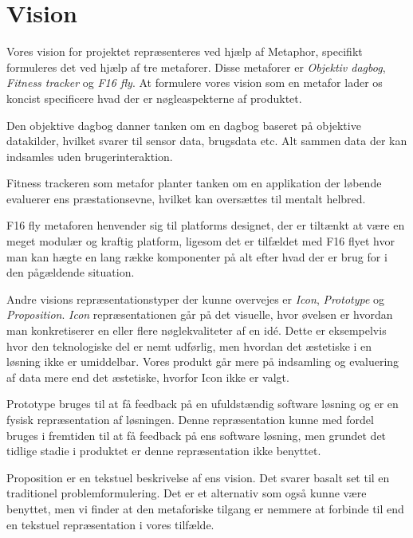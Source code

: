 \section{Vision}
Vores vision for projektet repræsenteres ved hjælp af Metaphor, specifikt formuleres det ved hjælp af tre metaforer.
Disse metaforer er \textit{Objektiv dagbog}, \textit{Fitness tracker} og \textit{F16 fly}.
At formulere vores vision som en metafor lader os koncist specificere hvad der er nøgleaspekterne af produktet.

Den objektive dagbog danner tanken om en dagbog baseret på objektive datakilder, hvilket svarer til sensor data, brugsdata etc.
Alt sammen data der kan indsamles uden brugerinteraktion.

Fitness trackeren som metafor planter tanken om en applikation der løbende evaluerer ens præstationsevne, hvilket kan oversættes til mentalt helbred.

F16 fly metaforen henvender sig til platforms designet, der er tiltænkt at være en meget modulær og kraftig platform, ligesom det er tilfældet med F16 flyet hvor man kan hægte en lang række komponenter på alt efter hvad der er brug for i den pågældende situation.

Andre visions repræsentationstyper der kunne overvejes er \textit{Icon}, \textit{Prototype} og \textit{Proposition}.
\textit{Icon} repræsentationen går på det visuelle, hvor øvelsen er hvordan man konkretiserer en eller flere nøglekvaliteter af en idé.
Dette er eksempelvis hvor den teknologiske del er nemt udførlig, men hvordan det æstetiske i en løsning ikke er umiddelbar.
Vores produkt går mere på indsamling og evaluering af data mere end det æstetiske, hvorfor Icon ikke er valgt.

Prototype bruges til at få feedback på en ufuldstændig software løsning og er en fysisk repræsentation af løsningen.
Denne repræsentation kunne med fordel bruges i fremtiden til at få feedback på ens software løsning, men grundet det tidlige stadie i produktet er denne repræsentation ikke benyttet.

Proposition er en tekstuel beskrivelse af ens vision. Det svarer basalt set til en traditionel problemformulering.
Det er et alternativ som også kunne være benyttet, men vi finder at den metaforiske tilgang er nemmere at forbinde til end en tekstuel repræsentation i vores tilfælde.